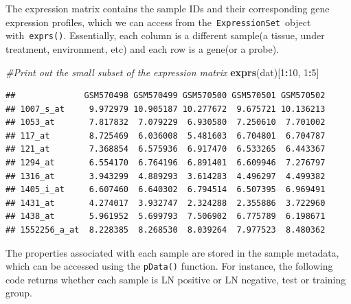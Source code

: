 \documentclass[
]{article}
\newenvironment{Shaded}{\begin{snugshade}}{\end{snugshade}}
\newcommand{\CommentTok}[1]{\textcolor[rgb]{0.56,0.35,0.01}{\textit{#1}}}
\newcommand{\DecValTok}[1]{\textcolor[rgb]{0.00,0.00,0.81}{#1}}
\newcommand{\FunctionTok}[1]{\textcolor[rgb]{0.13,0.29,0.53}{\textbf{#1}}}
\newcommand{\NormalTok}[1]{#1}
\newcommand{\SpecialCharTok}[1]{\textcolor[rgb]{0.81,0.36,0.00}{\textbf{#1}}}
\begin{document}
The expression matrix contains the sample IDs and their corresponding
gene expression profiles, which we can access from
the~\texttt{ExpressionSet}~object with~\texttt{exprs()}. Essentially,
each column is a different sample(a tissue, under treatment,
environment, etc) and each row is a gene(or a probe).

\begin{Shaded}
\begin{Highlighting}[]
\CommentTok{\#Print out the small subset of the expression matrix}
\FunctionTok{exprs}\NormalTok{(dat)[}\DecValTok{1}\SpecialCharTok{:}\DecValTok{10}\NormalTok{, }\DecValTok{1}\SpecialCharTok{:}\DecValTok{5}\NormalTok{]}
\end{Highlighting}
\end{Shaded}

\begin{verbatim}
##              GSM570498 GSM570499 GSM570500 GSM570501 GSM570502
## 1007_s_at     9.972979 10.905187 10.277672  9.675721 10.136213
## 1053_at       7.817832  7.079229  6.930580  7.250610  7.701002
## 117_at        8.725469  6.036008  5.481603  6.704801  6.704787
## 121_at        7.368854  6.575936  6.917470  6.533265  6.443367
## 1294_at       6.554170  6.764196  6.891401  6.609946  7.276797
## 1316_at       3.943299  4.889293  3.614283  4.496297  4.499382
## 1405_i_at     6.607460  6.640302  6.794514  6.507395  6.969491
## 1431_at       4.274017  3.932747  2.324288  2.355886  3.722960
## 1438_at       5.961952  5.699793  7.506902  6.775789  6.198671
## 1552256_a_at  8.228385  8.268530  8.039264  7.977523  8.480362
\end{verbatim}

The properties associated with each sample are stored in the sample
metadata, which can be accessed using the \texttt{pData()} function. For
instance, the following code returns whether each sample is LN positive
or LN negative, test or training group.
\end{document}
